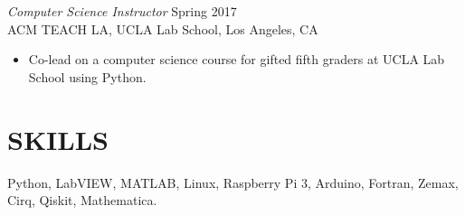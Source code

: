 \documentclass[margin,line]{res}
\begin{document}
\begin{resume}
{\sl Computer Science Instructor} \hfill        Spring 2017  \\
ACM TEACH LA, UCLA Lab School,   Los Angeles, CA
\begin{itemize} \itemsep -2pt 
	\item Co-lead on a computer science course for gifted fifth graders at UCLA Lab School using Python.
\end{itemize} 


\iffalse
{\sl CSL Fellow} \hfill        Fall 2016  \\
Hispanic Heritage Foundation,   San Fernando, CA
\begin{itemize} \itemsep -2pt 
	\item Provided programming fundamentals workshop for AP Computer Science students using Java at San Fernando High School Magnet program.
\end{itemize}
\fi

\section{SKILLS}  Python, LabVIEW, MATLAB, Linux, Raspberry Pi 3, Arduino, Fortran, Zemax, Cirq, Qiskit, Mathematica.


\end{resume}
\end{document}
